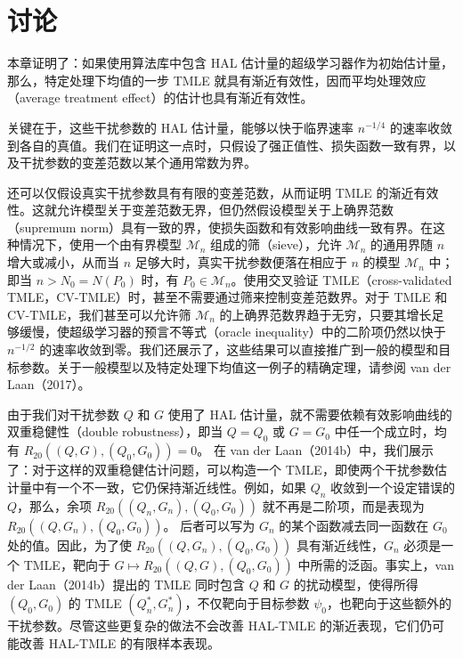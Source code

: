 \section{讨论}
\label{sec:ch07-discussion}

本章证明了：如果使用算法库中包含 HAL 估计量的超级学习器作为初始估计量，那么，特定处理下均值的一步 TMLE 就具有渐近有效性，因而平均处理效应（average treatment effect）的估计也具有渐近有效性。

\begin{sourcebox}
关键在于，这些干扰参数的 HAL 估计量，能够以快于临界速率 $n^{-1/4}$ 的速率收敛到各自的真值。我们在证明这一点时，只假设了强正值性、损失函数一致有界，以及干扰参数的变差范数以某个通用常数为界。
\end{sourcebox}

还可以仅假设真实干扰参数具有有限的变差范数，从而证明 TMLE 的渐近有效性。这就允许模型关于变差范数无界，但仍然假设模型关于上确界范数（supremum norm）具有一致的界，使损失函数和有效影响曲线一致有界。在这种情况下，使用一个由有界模型 $\mathcal M_n$ 组成的筛（sieve），允许 $\mathcal M_n$ 的通用界随 $n$ 增大或减小，从而当 $n$ 足够大时，真实干扰参数便落在相应于 $n$ 的模型 $\mathcal M_n$ 中；即当 $n>N_0=N(P_0)$ 时，有 $P_0\in\mathcal M_n$。使用交叉验证 TMLE（cross-validated TMLE，CV-TMLE）时，甚至不需要通过筛来控制变差范数界。对于 TMLE 和 CV-TMLE，我们甚至可以允许筛 $\mathcal M_n$ 的上确界范数界趋于无穷，只要其增长足够缓慢，使超级学习器的预言不等式（oracle inequality）中的二阶项仍然以快于 $n^{-1/2}$ 的速率收敛到零。我们还展示了，这些结果可以直接推广到一般的模型和目标参数。关于一般模型以及特定处理下均值这一例子的精确定理，请参阅 van der Laan（2017）。

由于我们对干扰参数 $Q$ 和 $G$ 使用了 HAL 估计量，就不需要依赖有效影响曲线的双重稳健性（double robustness），即当 $Q=Q_0$ 或 $G=G_0$ 中任一个成立时，均有
$R_{20}((Q,G),(Q_0,G_0))=0$。
在 van der Laan（2014b）中，我们展示了：对于这样的双重稳健估计问题，可以构造一个 TMLE，即使两个干扰参数估计量中有一个不一致，它仍保持渐近线性。例如，如果 $Q_n$ 收敛到一个设定错误的 $Q$，那么，余项
$R_{20}((Q_n,G_n),(Q_0,G_0))$
就不再是二阶项，而是表现为
$R_{20}((Q,G_n),(Q_0,G_0))$。
后者可以写为 $G_n$ 的某个函数减去同一函数在 $G_0$ 处的值。因此，为了使
$R_{20}((Q,G_n),(Q_0,G_0))$
具有渐近线性，$G_n$ 必须是一个 TMLE，靶向于
$G\mapsto R_{20}((Q,G),(Q_0,G_0))$
中所需的泛函。事实上，van der Laan（2014b）提出的 TMLE 同时包含 $Q$ 和 $G$ 的扰动模型，使得所得 $(Q_0,G_0)$ 的 TMLE $(Q_n^*,G_n^*)$，不仅靶向于目标参数 $\psi_0$，也靶向于这些额外的干扰参数。尽管这些更复杂的做法不会改善 HAL-TMLE 的渐近表现，它们仍可能改善 HAL-TMLE 的有限样本表现。

